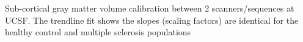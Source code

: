 \label{fig:hcms_scGMV} Sub-cortical gray matter volume calibration between 2 scanners/sequences at UCSF. The trendline fit shows the slopes (scaling factors) are identical for the healthy control and multiple sclerosis populations